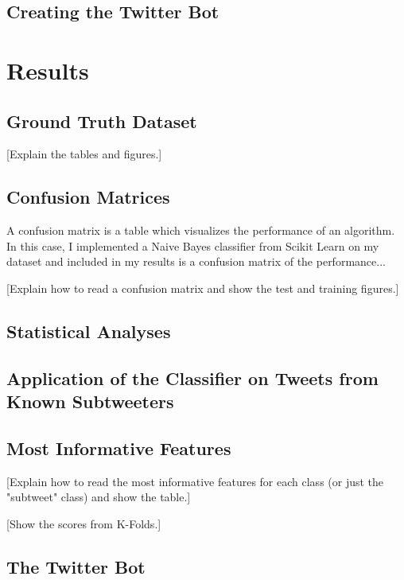 \documentclass[11pt, twoside, reqno]{book}
\begin{document}
\section{Creating the Twitter Bot}
\label{creating_twitter_bot}

\chapter{Results}
\label{results}

\section{Ground Truth Dataset}
\label{ground_truth_dataset}

[Explain the tables and figures.]

\section{Confusion Matrices}
\label{confusion_matrices}

A confusion matrix is a table which visualizes the performance of an algorithm. In this case, I implemented a Naive Bayes classifier from Scikit Learn on my dataset and included in my results is a confusion matrix of the performance...

[Explain how to read a confusion matrix and show the test and training figures.]

\section{Statistical Analyses}
\label{statistical_analyses}

\section{Application of the Classifier on Tweets from Known Subtweeters}
\label{known_subtweeters_analysis}

\section{Most Informative Features}
\label{most_informative_features}

[Explain how to read the most informative features for each class (or just the "subtweet" class) and show the table.]

[Show the scores from K-Folds.]

\section{The Twitter Bot}
\label{the_twitter_bot}
\end{document}
